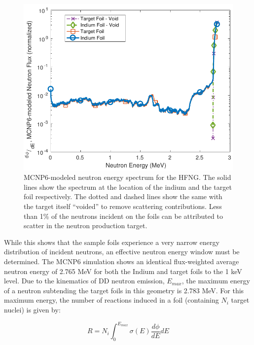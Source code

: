 \documentclass[5p]{elsarticle}
\newcommand{\comment}[1]{\todo[color=blue!20!white,inline]{ASV: #1}}
\begin{document}
\begin{figure}
 \centering
 \includegraphics[scale=0.6]{./figures/mcnp_flux_new.pdf}
 \caption{MCNP6-modeled neutron energy spectrum for the HFNG.  The solid lines show the spectrum at the location of the indium and the target foil respectively. The dotted and dashed lines show the same with the target itself \enquote{voided} to remove scattering contributions.  Less than 1\%  of the neutrons incident on the foils can be attributed to scatter in the neutron production target.}
 \label{fig:mcnp_flux}
\end{figure}





While this shows that the sample foils experience a very narrow energy distribution of incident neutrons, an effective neutron energy window must be determined. The MCNP6 simulation shows an identical flux-weighted average neutron energy of 2.765 MeV for both the Indium and target foils to the 1 keV level. Due to the kinematics of DD neutron emission, $E_{max}$,  the maximum energy of a neutron subtending the target foils in this geometry is 2.783 MeV. For this maximum energy, the number of reactions induced in a foil (containing $N_i$ target nuclei) is given by:

\begin{equation}
R = N_i \int_0^{E_{max}} \sigma(E) \dfrac{d\phi}{dE} dE
\end{equation}
\end{document}

